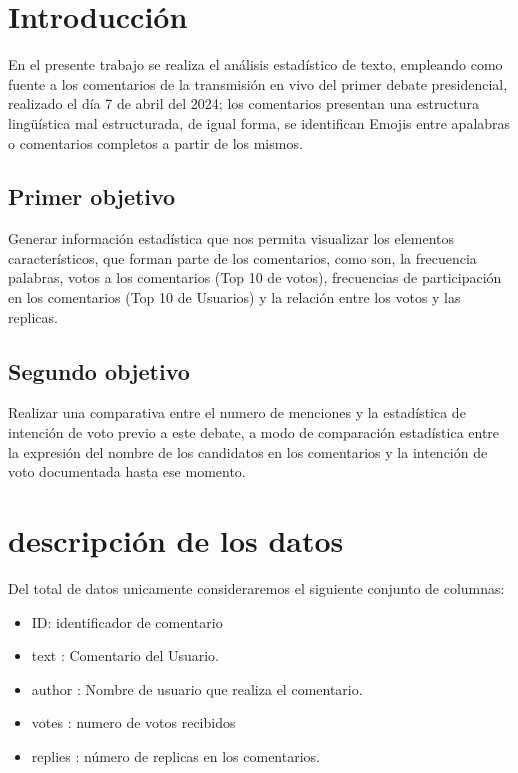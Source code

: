 \chapter{Introducción}

En el presente trabajo se realiza el análisis estadístico de texto, empleando como fuente a los comentarios de la transmisión en vivo del primer debate presidencial, realizado el día 7 de abril del 2024; los comentarios presentan una estructura lingüística mal estructurada, de igual forma, se identifican Emojis entre apalabras o comentarios completos a partir de los mismos.\\


\section{Primer objetivo}
 Generar información estadística que nos permita visualizar los elementos característicos, que forman parte de los comentarios, como son, la frecuencia palabras, votos a los comentarios (Top 10 de votos), frecuencias de participación en los comentarios (Top 10 de Usuarios) y la relación entre los votos y las replicas.\\

\section{Segundo objetivo}
 Realizar una comparativa entre el numero de menciones y la estadística de intención de voto previo a este debate, a modo de comparación estadística entre la expresión del nombre de los candidatos en los comentarios y la intención de voto documentada hasta ese momento.\\
   


\chapter{descripción de los datos}

Del total de datos unicamente consideraremos el siguiente conjunto de columnas:\\

\begin{itemize}
	\item ID: identificador de comentario
	\item text : Comentario del Usuario.
	\item author : Nombre de usuario que realiza el comentario.
	\item votes : numero de votos recibidos 
	\item replies : número de replicas en los comentarios.\\
\end{itemize} 

